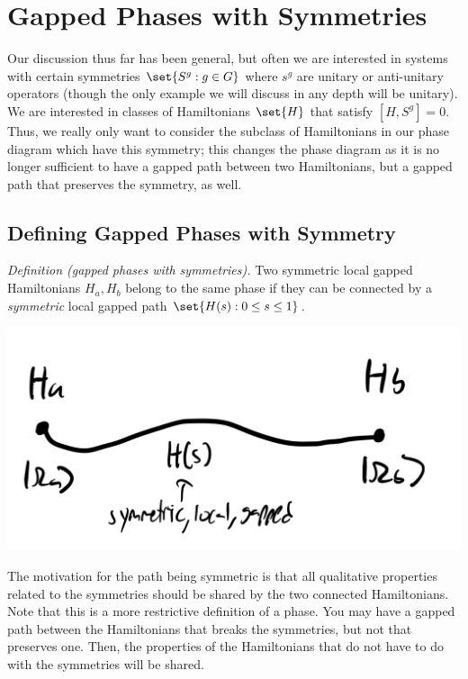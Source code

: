 \section{Gapped Phases with Symmetries}

Our discussion thus far has been general, but often we are interested in systems with certain symmetries $\set{S^g: g \in G}$ where $s^g$ are unitary or anti-unitary operators (though the only example we will discuss in any depth will be unitary). We are interested in classes of Hamiltonians $\set{H}$ that satisfy $[H, S^g] = 0$. Thus, we really only want to consider the subclass of Hamiltonians in our phase diagram which have this symmetry; this changes the phase diagram as it is no longer sufficient to have a gapped path between two Hamiltonians, but a gapped path that preserves the symmetry, as well.

\subsection{Defining Gapped Phases with Symmetry}

\textit{Definition (gapped phases with symmetries).} Two symmetric local gapped Hamiltonians $H_a, H_b$ belong to the same phase if they can be connected by a \emph{symmetric} local gapped path $\set{H(s): 0 \leq s \leq 1}$.

\begin{center}
    \includegraphics[scale=0.35]{Lectures/Images/lec13-sympath.png}
\end{center}

The motivation for the path being symmetric is that all qualitative properties related to the symmetries should be shared by the two connected Hamiltonians. Note that this is a more restrictive definition of a phase. You may have a gapped path between the Hamiltonians that breaks the symmetries, but not that preserves one. Then, the properties of the Hamiltonians that do not have to do with the symmetries will be shared.

